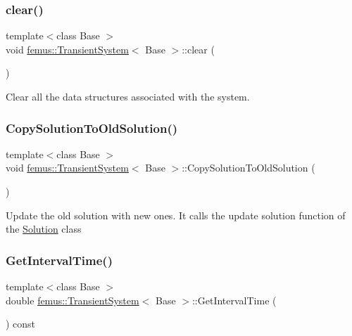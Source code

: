 \subsubsection{\texorpdfstring{clear()}{clear()}}
{\footnotesize\ttfamily template$<$class Base $>$ \\
void \mbox{\hyperlink{classfemus_1_1_transient_system}{femus\+::\+Transient\+System}}$<$ Base $>$\+::clear (\begin{DoxyParamCaption}{ }\end{DoxyParamCaption})\hspace{0.3cm}{\ttfamily [virtual]}}

Clear all the data structures associated with the system. \mbox{\label{classfemus_1_1_transient_system_a6bbd657b80c05844fca4b683c90d879e}} 
\subsubsection{\texorpdfstring{Copy\+Solution\+To\+Old\+Solution()}{CopySolutionToOldSolution()}}
{\footnotesize\ttfamily template$<$class Base $>$ \\
void \mbox{\hyperlink{classfemus_1_1_transient_system}{femus\+::\+Transient\+System}}$<$ Base $>$\+::Copy\+Solution\+To\+Old\+Solution (\begin{DoxyParamCaption}{ }\end{DoxyParamCaption})\hspace{0.3cm}{\ttfamily [virtual]}}

Update the old solution with new ones. It calls the update solution function of the \mbox{\hyperlink{classfemus_1_1_solution}{Solution}} class \mbox{\label{classfemus_1_1_transient_system_ac993f126734ae1c669e8470479d5c959}} 
\subsubsection{\texorpdfstring{Get\+Interval\+Time()}{GetIntervalTime()}}
{\footnotesize\ttfamily template$<$class Base $>$ \\
double \mbox{\hyperlink{classfemus_1_1_transient_system}{femus\+::\+Transient\+System}}$<$ Base $>$\+::Get\+Interval\+Time (\begin{DoxyParamCaption}{ }\end{DoxyParamCaption}) const\hspace{0.3cm}{\ttfamily [inline]}}

